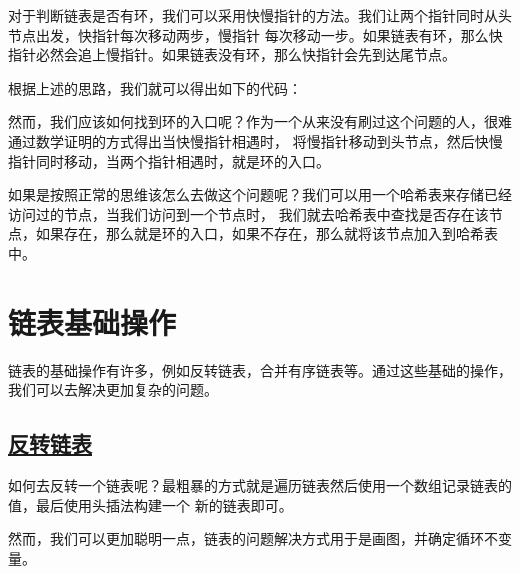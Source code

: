 \documentclass[../../main.tex]{subfiles}
\begin{document}
对于判断链表是否有环，我们可以采用快慢指针的方法。我们让两个指针同时从头节点出发，快指针每次移动两步，慢指针
每次移动一步。如果链表有环，那么快指针必然会追上慢指针。如果链表没有环，那么快指针会先到达尾节点。

根据上述的思路，我们就可以得出如下的代码：



然而，我们应该如何找到环的入口呢？作为一个从来没有刷过这个问题的人，很难通过数学证明的方式得出当快慢指针相遇时，
将慢指针移动到头节点，然后快慢指针同时移动，当两个指针相遇时，就是环的入口。

如果是按照正常的思维该怎么去做这个问题呢？我们可以用一个哈希表来存储已经访问过的节点，当我们访问到一个节点时，
我们就去哈希表中查找是否存在该节点，如果存在，那么就是环的入口，如果不存在，那么就将该节点加入到哈希表中。



\section{链表基础操作}

链表的基础操作有许多，例如反转链表，合并有序链表等。通过这些基础的操作，我们可以去解决更加复杂的问题。

\subsection{\href{https://leetcode.cn/problems/reverse-linked-list/}{反转链表}}

如何去反转一个链表呢？最粗暴的方式就是遍历链表然后使用一个数组记录链表的值，最后使用头插法构建一个
新的链表即可。

然而，我们可以更加聪明一点，链表的问题解决方式用于是画图，并确定循环不变量。
\end{document}
